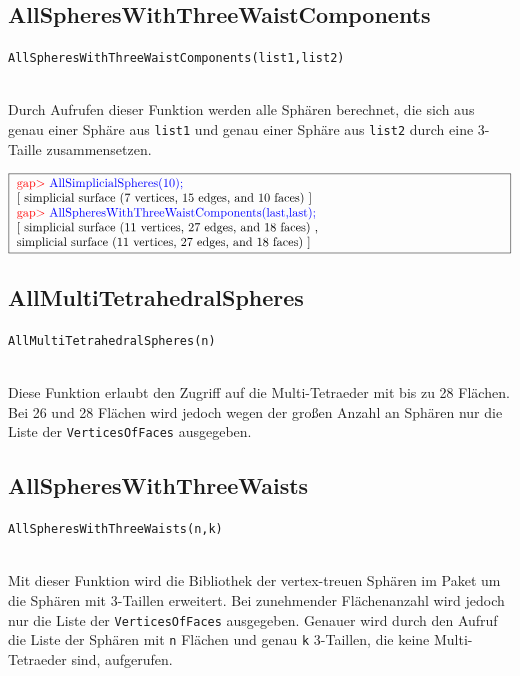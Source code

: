 \documentclass[12pt,titlepage,twoside,cleardoublepage]{article}
\theoremstyle{nummermitklammern}
\numberwithin{equation}{section}
\begin{document}
\subsection{AllSpheresWithThreeWaistComponents}
\begin{large}
\texttt{AllSpheresWithThreeWaistComponents(list1,list2)}
\end{large}\\
Durch Aufrufen dieser Funktion werden alle Sphären berechnet, die sich aus genau einer Sphäre aus \texttt{list1} und genau einer Sphäre aus \texttt{list2} durch eine 3-Taille zusammensetzen.
\begin{center}
$\fbox{
\parbox{14cm}{
\textcolor{red}{gap$>$} \textcolor{blue}{AllSimplicialSpheres(10);}\newline
[ simplicial surface (7 vertices, 15 edges, and 10 faces) ]\newline
\textcolor{red}{gap$>$} \textcolor{blue}{AllSpheresWithThreeWaistComponents(last,last);}\newline
[ simplicial surface (11 vertices, 27 edges, and 18 faces)
    ,\newline
  simplicial surface (11 vertices, 27 edges, and 18 faces)
 ]
}
}$
\end{center}
\subsection{AllMultiTetrahedralSpheres}
\begin{large}
\texttt{AllMultiTetrahedralSpheres(n)}
\end{large}\\
Diese Funktion erlaubt den Zugriff auf die Multi-Tetraeder mit bis zu 28 Flächen. Bei 26 und 28 Flächen wird jedoch wegen der großen Anzahl an Sphären nur die Liste der \texttt{VerticesOfFaces} ausgegeben.
\subsection{AllSpheresWithThreeWaists}
\begin{large}
\texttt{AllSpheresWithThreeWaists(n,k)}
\end{large}\\
Mit dieser Funktion wird die Bibliothek der vertex-treuen Sphären im Paket um die Sphären mit 3-Taillen erweitert.  Bei zunehmender Flächenanzahl wird jedoch nur die Liste der \texttt{VerticesOfFaces} ausgegeben. Genauer wird durch den Aufruf die Liste der Sphären mit \texttt{n} Flächen und genau \texttt{k} 3-Taillen, die keine Multi-Tetraeder sind, aufgerufen.
\end{document}
